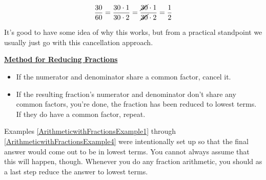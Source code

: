 $$\frac{30}{60} = \frac{30 \cdot 1}{30 \cdot 2} = \frac{\cancel{30} \cdot 1}{\cancel{30} \cdot 2} = \frac{1}{2}$$

It’s good to have some idea of why this works, but from a practical standpoint we usually just go with this cancellation approach.

%
%

\begin{definition}
	\textbf{\underline{Method for Reducing Fractions}}\\
	\bigskip
	\begin{itemize}[leftmargin=*]
		\item If the numerator and denominator share a common factor, cancel it.
		\item If the resulting fraction’s numerator and denominator don’t share any common factors, you’re done, the fraction has been reduced to lowest terms. If they do have a common factor, repeat.
	\end{itemize}
\end{definition}

Examples \ref{ArithmeticwithFractionsExample1} through \ref{ArithmeticwithFractionsExample4} were intentionally set up so that the final answer would come out to be in lowest terms. You cannot always assume that this will happen, though. Whenever you do any fraction arithmetic, you should as a last step reduce the answer to lowest terms.



\bigskip

%
%

